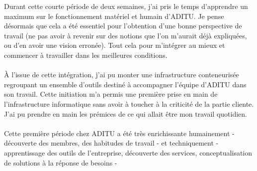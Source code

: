 \begin{resumo}
    Durant cette courte période de deux semaines, j'ai pris le temps d'apprendre un maximum sur le fonctionnement matériel et humain d'ADITU. Je pense désormais que cela a été essentiel pour l'obtention d'une bonne perspective de travail (ne pas avoir à revenir sur des notions que l'on m'aurait déjà expliquées, ou d'en avoir une vision erronée). Tout cela pour m'intégrer au mieux et commencer à travailler dans les meilleures conditions.
    \\ \\
    À l'issue de cette intégration, j'ai pu monter une infrastructure conteneurisée regroupant un ensemble d'outils destiné à accompagner l'équipe d'ADITU dans son travail. Cette initiation m'a permis une première prise en main de l'infrastructure informatique sans avoir à toucher à la criticité de la partie cliente. J'ai pu prendre en main les prémices de ce qui allait être mon travail quotidien.
    \\ \\
    Cette première période chez ADITU a été très enrichissante humainement - découverte des membres, des habitudes de travail - et techniquement - apprentissage des outils de l'entreprise, découverte des services, conceptualisation de solutions à la réponse de besoins -
    
\end{resumo}